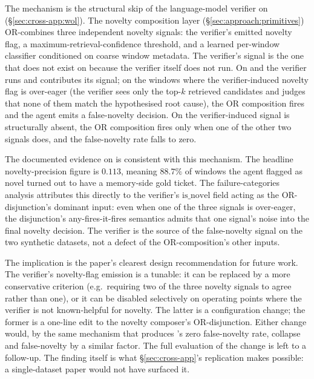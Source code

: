 The mechanism is the structural skip of the language-model verifier on \dswol{} (\S\ref{sec:cross-app:wol}). The novelty composition layer (\S\ref{sec:approach:primitives}) OR-combines three independent novelty signals: the verifier's emitted novelty flag, a maximum-retrieval-confidence threshold, and a learned per-window classifier conditioned on coarse window metadata. The verifier's signal is the one that does not exist on \dswol{} because the verifier itself does not run. On \dsob{} and \dsotel{} the verifier runs and contributes its signal; on the windows where the verifier-induced novelty flag is over-eager (the verifier sees only the top-$k$ retrieved candidates and judges that none of them match the hypothesised root cause), the OR composition fires and the agent emits a false-novelty decision. On \dswol{} the verifier-induced signal is structurally absent, the OR composition fires only when one of the other two signals does, and the false-novelty rate falls to zero.

The documented evidence on \dsob{} is consistent with this mechanism. The headline novelty-precision figure is $0.113$, meaning $88.7\%$ of windows the agent flagged as novel turned out to have a memory-side gold ticket. The failure-categories analysis attributes this directly to the verifier's $\text{is\_novel}$ field acting as the OR-disjunction's dominant input: even when one of the three signals is over-eager, the disjunction's any-fires-it-fires semantics admits that one signal's noise into the final novelty decision. The verifier is the source of the false-novelty signal on the two synthetic datasets, not a defect of the OR-composition's other inputs.

The implication is the paper's clearest design recommendation for future work. The verifier's novelty-flag emission is a tunable: it can be replaced by a more conservative criterion (e.g.\ requiring two of the three novelty signals to agree rather than one), or it can be disabled selectively on operating points where the verifier is not known-helpful for novelty. The latter is a configuration change; the former is a one-line edit to the novelty composer's OR-disjunction. Either change would, by the same mechanism that produces \dswol{}'s zero false-novelty rate, collapse \dsob{} and \dsotel{} false-novelty by a similar factor. The full evaluation of the change is left to a follow-up. The finding itself is what \S\ref{sec:cross-app}'s replication makes possible: a single-dataset paper would not have surfaced it.


